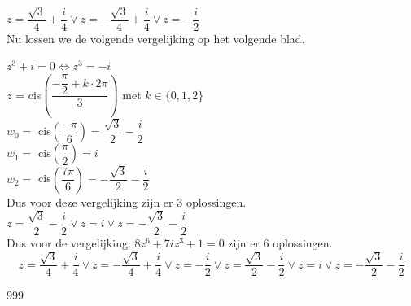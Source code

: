 \documentclass[a4paper]{article}
\begin{document}
$z = \dfrac{\sqrt{3}}{4} + \dfrac{i}{4}  \vee z = - \dfrac{\sqrt{3}}{4} + \dfrac{i}{4} \vee z = - \dfrac{i}{2}$\\

Nu lossen we de volgende vergelijking op het volgende blad.\\

\newpage

$z^3+i = 0 \Leftrightarrow z^3 = -i$\\

$z$ = cis$\left(\dfrac{- \dfrac{\pi}{2}+k\cdot 2\pi}{3}\right)$ met $k \in \{0,1,2\}$\\

$w_0 = $ cis$\left(\dfrac{- \pi}{6}\right) = \dfrac{\sqrt{3}}{2} - \dfrac{i}{2}$ \\

$w_1 = $ cis$\left(\dfrac{\pi}{2}\right) = i $ \\

$w_2 = $ cis$\left(\dfrac{7\pi}{6}\right) = - \dfrac{\sqrt{3}}{2} - \dfrac{i}{2}$ \\

Dus voor deze vergelijking zijn er 3 oplossingen.\\

$z = \dfrac{\sqrt{3}}{2} - \dfrac{i}{2}   \vee z =  i  \vee z = - \dfrac{\sqrt{3}}{2} - \dfrac{i}{2}$\\

Dus voor de vergelijking: $8z^6 + 7iz^3 + 1 = 0$ zijn er 6 oplossingen.\\

$$z = \dfrac{\sqrt{3}}{4} + \dfrac{i}{4} \vee z = - \dfrac{\sqrt{3}}{4} + \dfrac{i}{4} \vee z = - \dfrac{i}{2} \vee z =  \dfrac{\sqrt{3}}{2} - \dfrac{i}{2} \vee z = i \vee z = - \dfrac{\sqrt{3}}{2} - \dfrac{i}{2}$$

\begin{thebibliography}{999}
\end{thebibliography}
\end{document}
